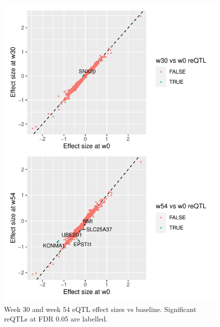 \begin{figure}
    \centering
    \includegraphics[width=1.0\textwidth,page=1]{mainmatter/figures/chapter_04/plot_dge_eqtl.pm_w30_vs_w0_and_w54_vs_w0}
    \caption{Week 30 and week 54 eQTL effect sizes vs baseline. Significant reQTLs at FDR 0.05 are labelled.}
    \label{fig:multipants_reQTL_pm_w30_vs_w0_and_w54_vs_w0}
\end{figure}


